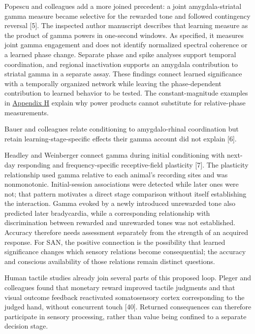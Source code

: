 \documentclass[
  american,
  11pt,
  letterpaper,
]{article}
\begin{document}
Popescu and colleagues add a more joined precedent: a joint amygdala-striatal gamma measure became selective for the rewarded tone and followed contingency reversal {[}5{]}. The inspected author manuscript describes that learning measure as the product of gamma powers in one-second windows. As specified, it measures joint gamma engagement and does not identify normalized spectral coherence or a learned phase change. Separate phase and spike analyses support temporal coordination, and regional inactivation supports an amygdala contribution to striatal gamma in a separate assay. These findings connect learned significance with a temporally organized network while leaving the phase-dependent contribution to learned behavior to be tested. The constant-magnitude examples in \href{https://zenodo.org/records/23509961/files/Learning-to-Feel-Technical-Supplement-v1.1.pdf\#appendix-h}{Appendix H} explain why power products cannot substitute for relative-phase measurements.

Bauer and colleagues relate conditioning to amygdalo-rhinal coordination but retain learning-stage-specific effects their gamma account did not explain {[}6{]}.

Headley and Weinberger connect gamma during initial conditioning with next-day responding and frequency-specific receptive-field plasticity {[}7{]}. The plasticity relationship used gamma relative to each animal's recording sites and was nonmonotonic. Initial-session associations were detected while later ones were not; that pattern motivates a direct stage comparison without itself establishing the interaction. Gamma evoked by a newly introduced unrewarded tone also predicted later bradycardia, while a corresponding relationship with discrimination between rewarded and unrewarded tones was not established. Accuracy therefore needs assessment separately from the strength of an acquired response. For SAN, the positive connection is the possibility that learned significance changes which sensory relations become consequential; the accuracy and conscious availability of those relations remain distinct questions.

Human tactile studies already join several parts of this proposed loop. Pleger and colleagues found that monetary reward improved tactile judgments and that visual outcome feedback reactivated somatosensory cortex corresponding to the judged hand, without concurrent touch {[}40{]}. Returned consequences can therefore participate in sensory processing, rather than value being confined to a separate decision stage.
\end{document}
